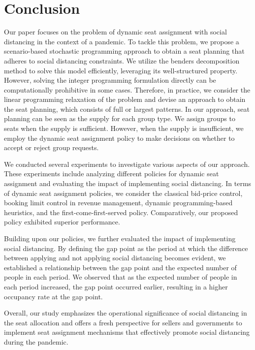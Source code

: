 \section{Conclusion}
Our paper focuses on the problem of dynamic seat assignment with social distancing in the context of a pandemic. To tackle this problem, we propose a scenario-based stochastic programming approach to obtain a seat planning that adheres to social distancing constraints. We utilize the benders decomposition method to solve this model efficiently, leveraging its well-structured property. However, solving the integer programming formulation directly can be computationally prohibitive in some cases. Therefore, in practice, we consider the linear programming relaxation of the problem and devise an approach to obtain the seat planning, which consists of full or largest patterns. In our approach, seat planning can be seen as the supply for each group type. We assign groups to seats when the supply is sufficient. However, when the supply is insufficient, we employ the dynamic seat assignment policy to make decisions on whether to accept or reject group requests. 


We conducted several experiments to investigate various aspects of our approach. These experiments include analyzing different policies for dynamic seat assignment and evaluating the impact of implementing social distancing. In terms of dynamic seat assignment policies, we consider the classical bid-price control, booking limit control in revenue management, dynamic programming-based heuristics, and the first-come-first-served policy. Comparatively, our proposed policy exhibited superior performance.

Building upon our policies, we further evaluated the impact of implementing social distancing. By defining the gap point as the period at which the difference between applying and not applying social distancing becomes evident, we established a relationship between the gap point and the expected number of people in each period. We observed that as the expected number of people in each period increased, the gap point occurred earlier, resulting in a higher occupancy rate at the gap point.

Overall, our study emphasizes the operational significance of social distancing in the seat allocation and offers a fresh perspective for sellers and governments to implement seat assignment mechanisms that effectively promote social distancing during the pandemic.

